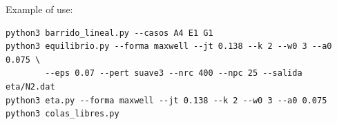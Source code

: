 \documentclass[11pt,a4paper]{article}
\begin{document}
Example of use:
\begin{verbatim}
python3 barrido_lineal.py --casos A4 E1 G1
python3 equilibrio.py --forma maxwell --jt 0.138 --k 2 --w0 3 --a0 0.075 \
        --eps 0.07 --pert suave3 --nrc 400 --npc 25 --salida eta/N2.dat
python3 eta.py --forma maxwell --jt 0.138 --k 2 --w0 3 --a0 0.075
python3 colas_libres.py
\end{verbatim}
\end{document}
